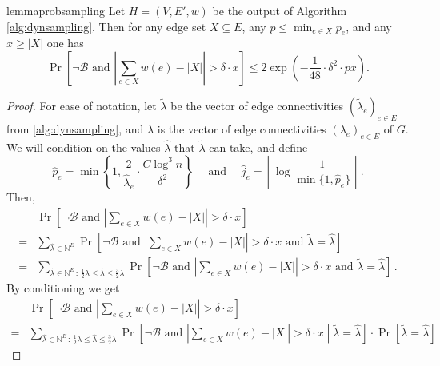 \begin{restatable}{lemma}{probsampling}
	\label{lem:probsampling}
	Let $H=(V,E',w)$ be the output of Algorithm \ref{alg:dynsampling}. Then for any edge set $X \subseteq E$, any $p \le \min_{e \in X} p_e$, and any $x \ge |X|$ one has
	\begin{equation*}
		\Pr\left[\neg \mathcal{B} \text{ and } \left|\sum_{e \in X} w(e) - |X|\right| > \delta \cdot x \right] \le 2 \exp\left(-\frac{1}{48} \cdot \delta^2 \cdot  p x\right).
	\end{equation*}
\end{restatable}
\begin{proof}
	For ease of notation, let $\tilde{\lambda}$ be the vector of edge connectivities $(\tilde{\lambda}_e)_{e \in E}$ from \cref{alg:dynsampling}, and $\lambda$ is the vector of edge connectivities $(\lambda_e)_{e\in E}$ of $G$. We will condition on the values $\hat{\lambda}$ that $\tilde{\lambda}$ can take, and define
	\begin{equation*}
		\hat{p}_e = \min \left\{1, \frac{2}{\hat{\lambda}_e}\cdot\frac{C \log^3 n}{\delta^2} \right\} \quad \text{ and } \quad  \hat{j}_e = \left\lfloor \log \frac{1}{\min\{1, \hat{p}_e\}}\right\rfloor  \, .
	\end{equation*}
	Then,
	\begin{align*}
		& \Pr\left[\neg \mathcal{B} \text{ and } \left|\sum_{e \in X} w(e) - |X|\right| > \delta \cdot x \right] \\
		= & \sum_{\hat{\lambda} \in \mathbb{N}^E} 	\Pr\left[\neg \mathcal{B} \text{ and } \left|\sum_{e \in X} w(e) - |X|\right| > \delta \cdot x  \text{ and } \tilde{\lambda}=\hat{\lambda} \right] \\
		= & \sum_{\hat{\lambda} \in \mathbb{N}^E \,:\, \frac{1}{2} \lambda \le {\hat{\lambda}} \le \frac{3}{2} \lambda	} \Pr\left[\neg \mathcal{B} \text{ and } \left|\sum_{e \in X} w(e) - |X|\right| > \delta \cdot x  \text{ and } \tilde{\lambda}=\hat{\lambda} \right] \, .
	\end{align*}
	By conditioning we get
	\begin{align*}
		& \Pr\left[\neg \mathcal{B} \text{ and } \left|\sum_{e \in X} w(e) - |X|\right| > \delta \cdot x \right] \\
		= & \sum_{\hat{\lambda} \in \mathbb{N}^E \,:\, \frac{1}{2} \lambda \le {\hat{\lambda}} \le \frac{3}{2} \lambda	} \Pr\left[\neg \mathcal{B}\text{ and } \left|\sum_{e \in X} w(e) - |X|\right| > \delta \cdot x  \middle| \tilde{\lambda}=\hat{\lambda} \right] \cdot \Pr\left[\tilde{\lambda}=\hat{\lambda}\right]

\end{align*}
\end{proof}
